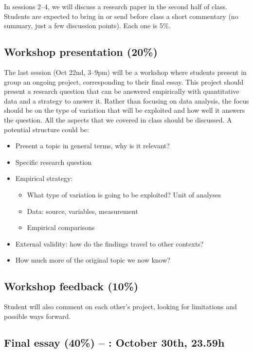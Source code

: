 \documentclass[12pt, a4paper]{article}
\begin{document}
In sessions 2--4, we will discuss a research paper in the second half of class. Students are expected to bring in or send before class a short commentary (no summary, just a few discussion points). Each one is 5\%.

\subsection*{Workshop presentation (20\%)}

The last session (Oct 22nd, 3--9pm) will be a workshop where students present in group an ongoing project, corresponding to their final essay. This project should present a research question that can be answered empirically with quantitative data and a strategy to answer it. Rather than focusing on data analysis, the focus should be on the type of variation that will be exploited and how well it answers the question. All the aspects that we covered in class should be discussed. A potential structure could be:

\begin{itemize}
\setlength\itemsep{-5pt}
  \item Present a topic in general terms, why is it relevant?
  \item Specific research question
  \item Empirical strategy:
  \vspace{-10pt}
  \begin{itemize}
  \setlength\itemsep{-5pt}
    \item What type of variation is going to be exploited? Unit of analyses
    \item Data: source, variables, measurement
    \item Empirical comparisons
  \end{itemize}
  \item External validity: how do the findings travel to other contexts?
  \item How much more of the original topic we now know?
\end{itemize}

\subsection*{Workshop feedback (10\%)}

Student will also comment on each other's project, looking for limitations and possible ways forward.

\subsection*{Final essay (40\%) -- {\color{red}{deadline}}: October 30th, 23.59h}
\end{document}
